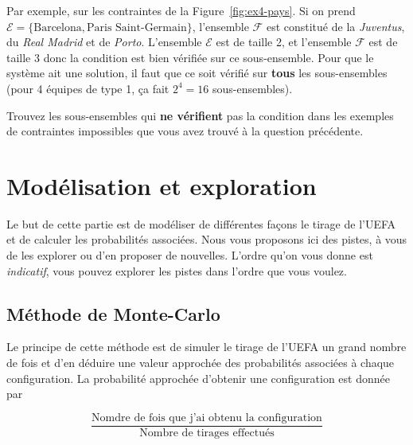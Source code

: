 \documentclass{../ficheTDTP}
\begin{document}
\begin{enumerate}
\begin{enumerate}
Par exemple, sur les contraintes de la Figure~\ref{fig:ex4-pays}. Si on prend $\mathcal{E} = \lbrace \text{Barcelona}, \text{Paris Saint-Germain} \rbrace$, l'ensemble $\mathcal{F}$ est constitué de la \textit{Juventus}, du \textit{Real Madrid} et de \textit{Porto}. L'ensemble $\mathcal{E}$ est de taille 2, et l'ensemble $\mathcal{F}$ est de taille 3 donc la condition est bien vérifiée sur ce sous-ensemble. Pour que le système ait une solution, il faut que ce soit vérifié sur \textbf{tous} les sous-ensembles (pour 4 équipes de type 1, ça fait $2^4 = 16$ sous-ensembles).

Trouvez les sous-ensembles qui \textbf{ne vérifient} pas la condition dans les exemples de contraintes impossibles que vous avez trouvé à la question précédente.
\end{enumerate} 
\end{enumerate}




\section{Modélisation et exploration}

Le but de cette partie est de modéliser de différentes façons le tirage de l'UEFA et de calculer les probabilités associées. Nous vous proposons ici des pistes, à vous de les explorer ou d'en proposer de nouvelles. L'ordre qu'on vous donne est \textit{indicatif}, vous pouvez explorer les pistes dans l'ordre que vous voulez. 

\subsection{Méthode de Monte-Carlo}

Le principe de cette méthode est de simuler le tirage de l'UEFA un grand nombre de fois et d'en déduire une valeur approchée des probabilités associées à chaque configuration. La probabilité approchée d'obtenir une configuration est donnée par 

\begin{equation*}
\frac{\text{Nomdre de fois que j'ai obtenu la configuration}}{\text{Nombre de tirages effectués}}
\end{equation*}
\end{document}
